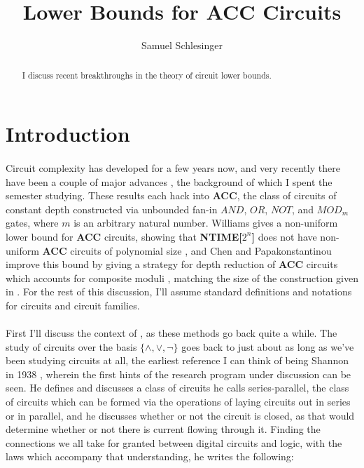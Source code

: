 \documentclass{article}
\title{Lower Bounds for ACC Circuits}
\author{Samuel Schlesinger}
\begin{document}
\maketitle

\begin{abstract}
I discuss recent breakthroughs in the theory of circuit lower bounds.
\end{abstract}

\section*{Introduction}

\paragraph*{}
  Circuit complexity has developed for a few years now, and very recently there have
been a couple of major advances \cite{Williams2010} \cite{Chen2016}, the background of
which I spent the semester studying. These results each hack into \textbf{ACC}, the
class of circuits of constant depth constructed via unbounded fan-in $AND$, $OR$, $NOT$,
and $MOD_m$ gates, where $m$ is an arbitrary natural number. Williams gives a non-uniform
lower bound for \textbf{ACC} circuits, showing that \textbf{NTIME[$2^n$]} does not have
non-uniform \textbf{ACC} circuits of polynomial size \cite{Williams2010}, and Chen
and Papakonstantinou improve this bound by giving a strategy for depth reduction of
\textbf{ACC} circuits which accounts for composite moduli \cite{Chen2016}, matching
the size of the construction given in \cite{Allender1991}. For the rest of this discussion, 
I'll assume standard definitions and notations for circuits and circuit families.

\paragraph*{}
  First I'll discuss the context of \cite{Chen2016}, as these methods go back quite a while.
The study of circuits over the basis $\{\wedge, \vee, \neg\}$ goes back to just about as
long as we've been studying circuits at all, the earliest reference I can think of being
Shannon in 1938 \cite{Shannon1938}, wherein the first hints of the research program under
discussion can be seen. He defines and discusses a class of circuits he calls series-parallel,
the class of circuits which can be formed via the operations of laying circuits out in
series or in parallel, and he discusses whether or not the circuit is closed, as that would
determine whether or not there is current flowing through it. Finding the connections we
all take for granted between digital circuits and logic, with the laws which accompany that
understanding, he writes the following:
\end{document}
